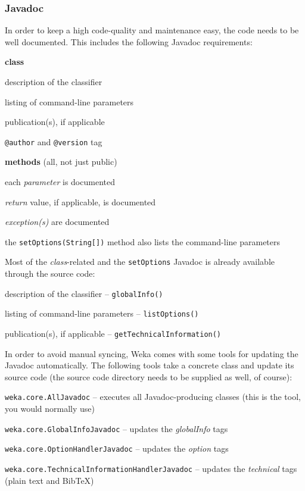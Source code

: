 \newpage
\subsubsection*{Javadoc}
\label{classifier_javadoc}
In order to keep a high code-quality and maintenance easy, the code needs to
be well documented. This includes the following Javadoc requirements:
\begin{tight_itemize}
  \item \textbf{class}
    \begin{tight_itemize}
      \item description of the classifier
      \item listing of command-line parameters
      \item publication(s), if applicable
      \item \texttt{@author} and \texttt{@version} tag
    \end{tight_itemize}

  \item \textbf{methods} (all, not just public)
    \begin{tight_itemize}
      \item each \textit{parameter} is documented
      \item \textit{return} value, if applicable, is documented
      \item \textit{exception(s)} are documented
      \item the \texttt{setOptions(String[])} method also lists the
command-line parameters
    \end{tight_itemize}
\end{tight_itemize}
Most of the \textit{class}-related and the \texttt{setOptions} Javadoc is
already available through the source code:
\begin{tight_itemize}
  \item description of the classifier -- \texttt{globalInfo()}
  \item listing of command-line parameters -- \texttt{listOptions()}
  \item publication(s), if applicable -- \texttt{getTechnicalInformation()}
\end{tight_itemize}
In order to avoid manual syncing, Weka comes with some tools for updating the
Javadoc automatically. The following tools take a concrete class and update its
source code (the source code directory needs to be supplied as well, of course):
\begin{tight_itemize}
  \item \texttt{weka.core.AllJavadoc} -- executes all Javadoc-producing
classes (this is the tool, you would normally use)
  \item \texttt{weka.core.GlobalInfoJavadoc} -- updates the \textit{globalInfo}
tags
  \item \texttt{weka.core.OptionHandlerJavadoc} -- updates the \textit{option}
tags
  \item \texttt{weka.core.TechnicalInformationHandlerJavadoc} -- updates the
\textit{technical} tags (plain text and BibTeX)
\end{tight_itemize}
